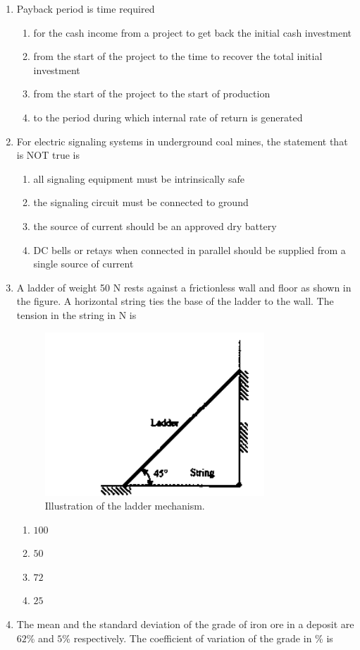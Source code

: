 \documentclass[journal,12pt,onecolumn]{IEEEtran}
\theoremstyle{remark}
\begin{document}
\begin{enumerate}
\item Payback period is time required

\hfill{}
\begin{enumerate}
\item for the cash income from a project to get back the initial cash investment  
\item from the start of the project to the time to recover the total initial investment  
\item from the start of the project to the start of production  
\item to the period during which internal rate of return is generated  
\end{enumerate}

\item For electric signaling systems in underground coal mines, the statement that is NOT true is

\hfill{}
\begin{enumerate}
\item all signaling equipment must be intrinsically safe
\item the signaling circuit must be connected to ground
\item the source of current should be an approved dry battery
\item DC bells or retays when connected in parallel should be supplied from a single source of current
\end{enumerate}
\item  A ladder of weight 50 N rests against a frictionless wall and floor as shown in the figure. A horizontal string ties the base of the ladder to the wall. The tension in the string in N is

\hfill{}
\begin{figure}[H]
  \centering
  \includegraphics[width=0.4\columnwidth]{figs/ladder.png}
  \caption{Illustration of the ladder mechanism.}
  \label{fig:ladder}
\end{figure}
\begin{multicols}{4}
\begin{enumerate}
\item $100$
\item $50$
\item $72$
\item $25$
\end{enumerate}
\end{multicols}
\item The mean and the standard deviation of the grade of iron ore in a deposit are $62$\% and $5$\%
respectively. The coefficient of variation of the grade in \% is


\end{enumerate}
\end{document}
